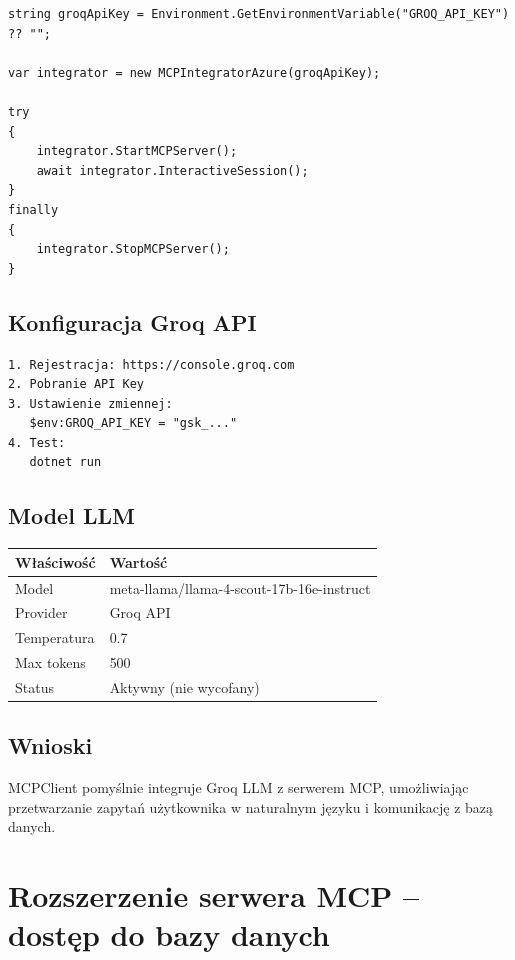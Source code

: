 \documentclass[twoside]{article}
\begin{document}
\begin{lstlisting}
string groqApiKey = Environment.GetEnvironmentVariable("GROQ_API_KEY") ?? "";

var integrator = new MCPIntegratorAzure(groqApiKey);

try
{
	integrator.StartMCPServer();
	await integrator.InteractiveSession();
}
finally
{
	integrator.StopMCPServer();
}
\end{lstlisting}

\subsection{Konfiguracja Groq API}

\begin{verbatim}
1. Rejestracja: https://console.groq.com
2. Pobranie API Key
3. Ustawienie zmiennej:
   $env:GROQ_API_KEY = "gsk_..."
4. Test:
   dotnet run
\end{verbatim}

\subsection{Model LLM}

\begin{table}[H]
	\centering
	\begin{tabular}{|l|l|}
		\hline
		\textbf{Właściwość} & \textbf{Wartość} \\
		\hline
		Model & meta-llama/llama-4-scout-17b-16e-instruct \\
		\hline
		Provider & Groq API \\
		\hline
		Temperatura & 0.7 \\
		\hline
		Max tokens & 500 \\
		\hline
		Status & Aktywny (nie wycofany) \\
		\hline
	\end{tabular}
\end{table}

\subsection{Wnioski}

MCPClient pomyślnie integruje Groq LLM z serwerem MCP, umożliwiając przetwarzanie zapytań użytkownika w naturalnym języku i komunikację z bazą danych.

\section{Rozszerzenie serwera MCP – dostęp do bazy danych}
\end{document}
